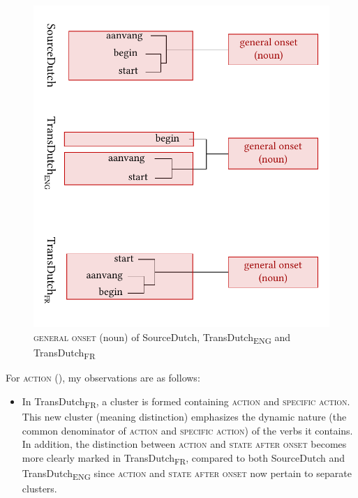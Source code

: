 \begin{figure}
\includegraphics[width=\textwidth]{figures/tree88.pdf}
\caption{\label{fig:4:85}\textsc{general onset} (noun) of SourceDutch, TransDutch\textsubscript{ENG} and TransDutch\textsubscript{FR}}
\end{figure}

For \textsc{action} (), my observations are as follows:

\begin{itemize}
\item  In TransDutch\textsubscript{FR}, a cluster is formed containing \textsc{action} and {\textsc{specific}} \textsc{action}. This new cluster (meaning distinction) emphasizes the dynamic nature (the common denominator of \textsc{action} and {\textsc{specific}} \textsc{action}) of the verbs it contains. In addition, the distinction between \textsc{action} and \textsc{state after onset} becomes more clearly marked in TransDutch\textsubscript{FR}, compared to both SourceDutch and TransDutch\textsubscript{ENG} since \textsc{action} and \textsc{state after onset} now pertain to separate clusters.
\end{itemize}

